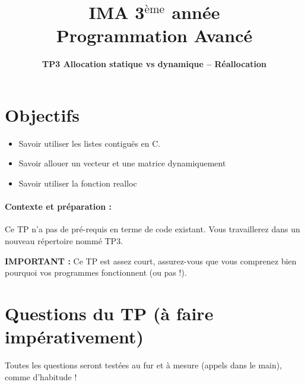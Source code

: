 \documentclass[final, pdftex, a4paper, openbib, ]{article}
\title{IMA 3$^{\mbox{\`eme}}$ année\\ Programmation Avancé
}
\author{\huge \textbf{TP3 Allocation statique vs dynamique -- Réallocation}}
\date{}
\begin{document}
\posttitle{\par\end{center}}
\setlength{\droptitle}{-45pt}
\maketitle

\vspace{-1.7cm}
\section{Objectifs}

\begin{itemize}
	\item Savoir utiliser les listes contiguës en C.
	\item Savoir allouer un vecteur et une matrice dynamiquement
	\item Savoir utiliser la fonction realloc
\end{itemize}


\paragraph{Contexte et préparation : } Ce TP n'a pas de pré-requis en terme de code existant. Vous travaillerez dans un nouveau répertoire nommé TP3.


\begin{alertinfo}{}
	\textbf{IMPORTANT :} Ce TP est assez court, assurez-vous que vous comprenez bien pourquoi vos programmes
	fonctionnent (ou pas !).
\end{alertinfo}


\section{Questions du TP \large (à faire impérativement)}

Toutes les questions seront testées au fur et à mesure (appels dans le main), comme d'habitude !
\end{document}
